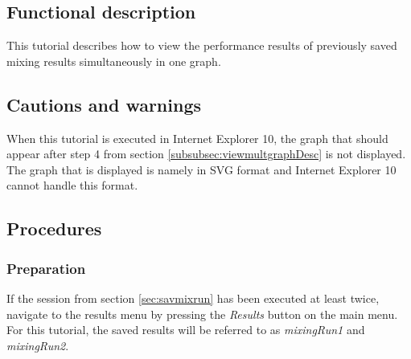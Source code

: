 \subsection{Functional description}
This tutorial describes how to view the performance results of previously saved mixing results simultaneously in one graph.

\subsection{Cautions and warnings}
When this tutorial is executed in Internet Explorer 10, the graph that should appear after step 4 from section \ref{subsubsec:viewmultgraphDesc} is not displayed. The graph that is displayed is namely in SVG format and Internet Explorer 10 cannot handle this format.

\subsection{Procedures}

\subsubsection{Preparation}
If the session from section \ref{sec:savmixrun} has been executed at least twice, navigate to the results menu by pressing the \emph{Results} button on the main menu.
For this tutorial, the saved results will be referred to as \emph{mixingRun1} and \emph{mixingRun2}.

